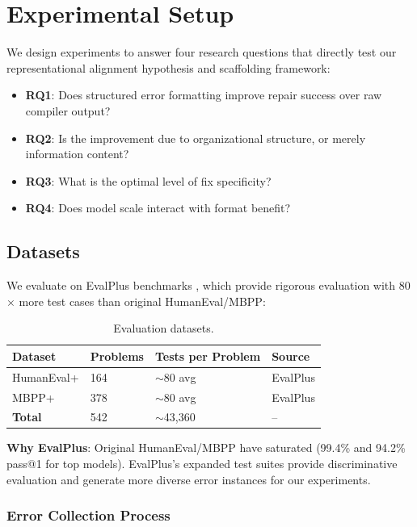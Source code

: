 \section{Experimental Setup}

We design experiments to answer four research questions that directly test our representational alignment hypothesis and scaffolding framework:

\begin{itemize}
    \item \textbf{RQ1}: Does structured error formatting improve repair success over raw compiler output?
    \item \textbf{RQ2}: Is the improvement due to organizational structure, or merely information content?
    \item \textbf{RQ3}: What is the optimal level of fix specificity?
    \item \textbf{RQ4}: Does model scale interact with format benefit?
\end{itemize}

\subsection{Datasets}

We evaluate on EvalPlus benchmarks \citep{guo2024evalplus}, which provide rigorous evaluation with 80$\times$ more test cases than original HumanEval/MBPP:

\begin{table}[H]
\centering
\begin{tabular}{@{}llll@{}}
\toprule
\textbf{Dataset} & \textbf{Problems} & \textbf{Tests per Problem} & \textbf{Source} \\
\midrule
HumanEval+ & 164 & $\sim$80 avg & EvalPlus \\
MBPP+ & 378 & $\sim$80 avg & EvalPlus \\
\textbf{Total} & 542 & $\sim$43,360 & -- \\
\bottomrule
\end{tabular}
\caption{Evaluation datasets.}
\end{table}

\textbf{Why EvalPlus}: Original HumanEval/MBPP have saturated (99.4\% and 94.2\% pass@1 for top models). EvalPlus's expanded test suites provide discriminative evaluation and generate more diverse error instances for our experiments.

\subsubsection{Error Collection Process}

